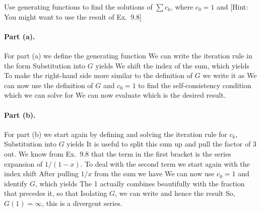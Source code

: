 
Use generating functions to find the solutions of $\sum c_k$, where
$c_0=1$ and 
[Hint: You might want to use the result of Ex.~9.8]

\solution 
\paragraph{Part (a).}For part (a) we define the generating function
We can write the iteration rule in the form 
Substitution into $G$ yields 
We shift the index of the sum, which yields
To make the right-hand side more similar to the definition of $G$ we write it as  
We can now use the definition of $G$ and $c_0=1$ to find the self-consistency condition
which we can solve for
We can now evaluate
which is the desired result. 

\paragraph{Part (b).}For part (b) we start again by defining 
and solving the iteration rule for $c_k$,
Substitution into $G$ yields
It is useful to split this sum up and pull the factor of 3 out. 
We know from Ex.~9.8 that the term in the first bracket is the series expansion of $1/(1-x)$. To deal with the second term we start again with the index shift
After pulling $1/x$ from the sum we have
We can now use $c_0=1$ and identify $G$, which yields
The 1 actually combines beautifully with the fraction that precedes it, so that 
Isolating $G$, we can write
and hence the result 
So, $G(1)=\infty$, this is a divergent series. 
\solutionend
